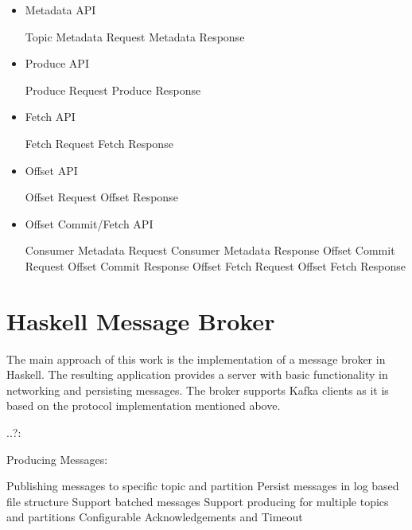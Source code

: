 \begin{itemize}
    \item Metadata API
    \begin{itemize}
        \tick Topic Metadata Request
        \tick Metadata Response
    \end{itemize}
    \item Produce API
    \begin{itemize}
        \tick Produce Request
        \tick Produce Response
    \end{itemize}
    \item Fetch API
    \begin{itemize}
        \tick Fetch Request
        \tick Fetch Response
    \end{itemize}
    \item Offset API
    \begin{itemize}
        \fail Offset Request
        \fail Offset Response
    \end{itemize}

    \item Offset Commit/Fetch API
    \begin{itemize}
        \fail Consumer Metadata Request
        \fail Consumer Metadata Response
        \fail Offset Commit Request
        \fail Offset Commit Response
        \fail Offset Fetch Request
        \fail Offset Fetch Response
    \end{itemize}
\end{itemize}

\section{Haskell Message Broker}
The main approach of this work is the implementation of a message broker in
Haskell. The resulting application provides a server with basic functionality
in networking and persisting messages. The broker supports Kafka clients as
it is based on the protocol implementation mentioned above.

..?: 

Producing Messages: 
\begin{itemize}
        \tick Publishing messages to specific topic and partition
        \tick Persist messages in log based file structure
        \tick Support batched messages 
        \tick Support producing for multiple topics and partitions
        \fail Configurable Acknowledgements and Timeout
\end{itemize}

